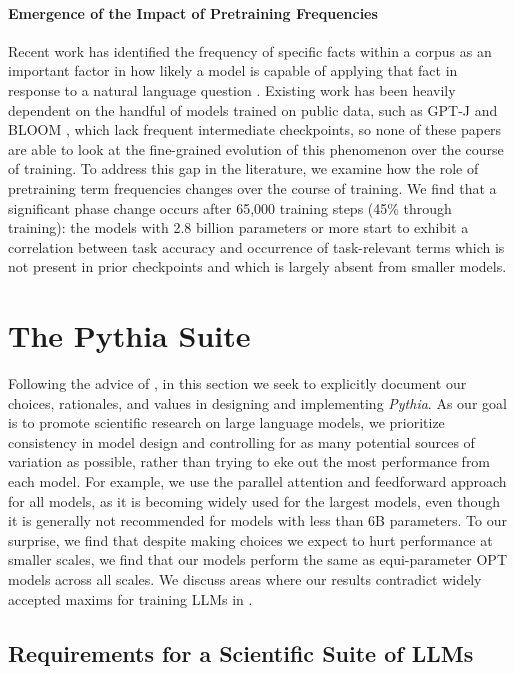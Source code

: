 \documentclass{article}
\theoremstyle{plain}
\theoremstyle{definition}
\theoremstyle{remark}
\begin{document}
\paragraph{Emergence of the Impact of Pretraining Frequencies} Recent work has identified the frequency of specific facts within a corpus as an important factor in how likely a model is capable of applying that fact in response to a natural language question \citep{razeghi2022impact,elazar2022measuring,kandpal2022large,mallen2022parametric}. Existing work has been heavily dependent on the handful of models trained on public data, such as GPT-J \citep{gpt-j} and BLOOM \citep{scao2022bloom}, which lack frequent intermediate checkpoints, so none of these papers are able to look at the fine-grained evolution of this phenomenon over the course of training. To address this gap in the literature, we examine how the role of pretraining term frequencies changes over the course of training. We find that a significant phase change occurs after 65,000 training steps (45\% through training): the models with 2.8 billion parameters or more start to exhibit a correlation between task accuracy and occurrence of task-relevant terms which is not present in prior checkpoints and which is largely absent from smaller models.

\section{The Pythia Suite}\label{sec:pythia}

Following the advice of \citet{birhane2021values}, in this section we seek to explicitly document our choices, rationales, and values in designing and implementing \textit{Pythia}. As our goal is to promote scientific research on large language models, we prioritize consistency in model design and controlling for as many potential sources of variation as possible, rather than trying to eke out the most performance from each model. For example, we use the parallel attention and feedforward approach for all models, as it is becoming widely used for the largest models, even though it is generally not recommended for models with less than 6B parameters. To our surprise, we find that despite making choices we expect to hurt performance at smaller scales, we find that our models perform the same as equi-parameter OPT models across all scales. We discuss areas where our results contradict widely accepted maxims for training LLMs in .

\subsection{Requirements for a Scientific Suite of LLMs}
\end{document}
